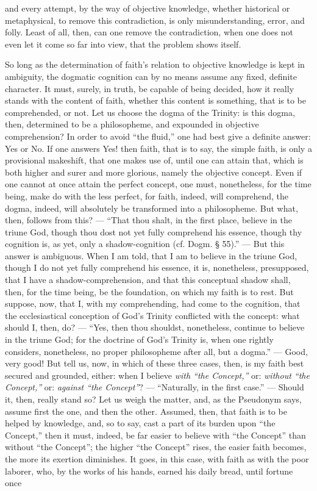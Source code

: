 \documentclass[12pt]{book}
\begin{document}
and every attempt, by the way of objective knowledge, whether historical or metaphysical, to remove this contradiction, is only misunderstanding, error, and folly. Least of all, then, can one remove the contradiction, when one does not even let it come so far into view, that the problem shows itself.

So long as the determination of faith's relation to objective knowledge is kept in ambiguity, the dogmatic cognition can by no means assume any fixed, definite character. It must, surely, in truth, be capable of being decided, how it really stands with the content of faith, whether this content is something, that is to be comprehended, or not. Let us choose the dogma of the Trinity: is this dogma, then, determined to be a philosopheme, and expounded in objective comprehension? In order to avoid ``the fluid,'' one had best give a definite answer: Yes or No. If one answers Yes! then faith, that is to say, the simple faith, is only a provisional makeshift, that one makes use of, until one can attain that, which is both higher and surer and more glorious, namely the objective concept. Even if one cannot at once attain the perfect concept, one must, nonetheless, for the time being, make do with the less perfect, for faith, indeed, will comprehend, the dogma, indeed, will absolutely be transformed into a philosopheme. But what, then, follows from this? --- ``That thou shalt, in the first place, believe in the triune God, though thou dost not yet fully comprehend his essence, though thy cognition is, as yet, only a shadow-cognition (cf. Dogm. § 55).'' --- But this answer is
ambiguous. When I am told, that I am to believe in the triune God, though I do not yet fully comprehend his essence, it is, nonetheless, presupposed, that I have a shadow-comprehension, and that this conceptual shadow shall, then, for the time being, be the foundation, on which my faith is to rest. But suppose, now, that I, with my comprehending, had come to the cognition, that the ecclesiastical conception of God's Trinity conflicted with the concept: what should I, then, do? --- ``Yes, then thou shouldst, nonetheless, continue to believe in the triune God; for the doctrine of God's Trinity is, when one rightly considers, nonetheless, no proper philosopheme after all, but a dogma.'' --- Good, very good! But tell us, now, in which of these three cases, then, is my faith best secured and grounded, either: when I believe \emph{with ``the Concept,''} or: \emph{without ``the Concept,''} or: \emph{against ``the Concept''}? --- ``Naturally, in the first case.'' --- Should it, then, really stand so? Let us weigh the matter, and, as the Pseudonym says, assume first the one, and then the other. Assumed, then, that faith is to be helped by knowledge, and, so to say, cast a part of its burden upon ``the Concept,'' then it must, indeed, be far easier to believe with ``the Concept'' than without ``the Concept''; the higher ``the Concept'' rises, the easier faith becomes, the more its exertion diminishes. It goes, in this case, with faith as with the poor laborer, who, by the works of his hands, earned his daily bread, until fortune once
\end{document}
